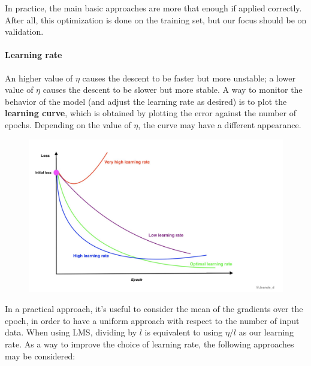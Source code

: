 In practice, the main basic approaches are more that enough if applied correctly. After all, this optimization is done on the training set, but our focus should be on validation.

\paragraph{Learning rate}

An higher value of $\eta$ causes the descent to be faster but more unstable; a lower value of $\eta$ causes the descent to be slower but more stable. A way to monitor the behavior of the model (and adjust the learning rate as desired) is to plot the \textbf{learning curve}, which is obtained by plotting the error against the number of epochs. Depending on the value of $\eta$, the curve may have a different appearance.

\begin{figure}[h]
    \centering
    \includegraphics[width=0.5\linewidth]{img/Learning curve and eta.png}
\end{figure}
In a practical approach, it's useful to consider the mean of the gradients over the epoch, in order to have a uniform approach with respect to the number of input data. When using LMS, dividing by $l$ is equivalent to using $\eta/l$ as our learning rate. As a way to improve the choice of learning rate, the following approaches may be considered:

